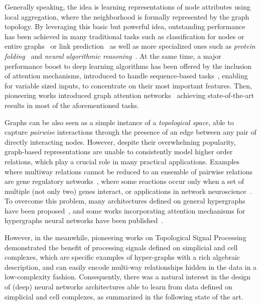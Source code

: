 \documentclass{article}
\begin{document}
Generally speaking, the idea is learning representations of node attributes using local aggregation, where the neighborhood is formally represented by the graph topology. By leveraging this basic but powerful idea, outstanding performance has been achieved in many traditional tasks such as classification for nodes or entire graphs~\cite{kipf2016semi, velivckovic2017graph, hamilton2017inductive} or link prediction~\cite{zhang2018link} as well as more specialized ones such as \emph{protein folding}~\cite{jumper2021highly} and \emph{neural algorithmic reasoning}~\cite{davies2021advancing, velivckovic2021neural}. At the same time, a major performance boost to deep learning algorithms has been offered by the inclusion of attention mechanisms, introduced to handle sequence-based tasks~\cite{bahdanau2014neural}, enabling for variable sized inputs, to concentrate on their most important features. Then, pioneering works introduced  graph attention networks~\cite{velivckovic2017graph, yun2019graph, EdgeRibeiro} achieving state-of-the-art results in most of the aforementioned tasks. 

Graphs can be also seen as a simple instance of a \emph{topological space}, able to capture {\it pairwise} interactions through the presence of an edge between any pair of directly interacting nodes. However, despite their overwhelming popularity, graph-based representations are unable to consistently model higher order relations, which play a crucial role in many practical applications. Examples where multiway relations cannot be reduced to an ensemble of pairwise relations are gene regulatory networks~\cite{sever2015signal,lambiotte2019networks}, where some reactions occur only when a set of multiple (not only two) genes interact, or applications in network neuroscience~\cite{giusti2016two, sizemore2018cliques}.
To overcome this problem, many architectures defined on general hypergraphs have been proposed~\cite{chien2022you,Yadati2019, hypergraphneuarlnet, Zhang2020Hyper-SAGNN:,NEURIPS2020_217eedd1}, and some works incorporating attention mechanisms for hypergraphs neural networks have been published~\cite{HyperAttMultimodal, HyperAttNetworks}.

However, in the meanwhile, pioneering works on Topological Signal Processing~\cite{barbarossa2020topological, sardellitti2022cell} demonstrated the benefit of processing signals defined on simplicial and cell complexes, which are specific examples of hyper-graphs with a rich algebraic description, and can easily encode multi-way relationships hidden in the data in a low-complexity fashion. Consequently, there was a natural interest in the design of (deep) neural networks architectures able to learn from data defined on simplicial and cell complexes, as summarized in the following state of the art.\\
\end{document}
